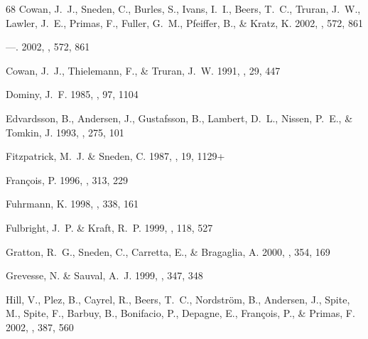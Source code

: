 \documentclass[12pt,preprint]{aastex}
\begin{document}
{\begin{thebibliography}{68}
{Cowan}, J.~J., {Sneden}, C., {Burles}, S., {Ivans}, I.~I., {Beers}, T.~C.,
  {Truran}, J.~W., {Lawler}, J.~E., {Primas}, F., {Fuller}, G.~M., {Pfeiffer},
  B., \& {Kratz}, K. 2002{}, \apj, 572, 861

---. 2002{}, \apj, 572, 861

{Cowan}, J.~J., {Thielemann}, F., \& {Truran}, J.~W. 1991, \araa, 29, 447

{Dominy}, J.~F. 1985, \pasp, 97, 1104

{Edvardsson}, B., {Andersen}, J., {Gustafsson}, B., {Lambert}, D.~L., {Nissen},
  P.~E., \& {Tomkin}, J. 1993, \aap, 275, 101

{Fitzpatrick}, M.~J. \& {Sneden}, C. 1987, \baas, 19, 1129+

{Fran\c{c}ois}, P. 1996, \aap, 313, 229

{Fuhrmann}, K. 1998, \aap, 338, 161

{Fulbright}, J.~P. \& {Kraft}, R.~P. 1999, \aj, 118, 527

{Gratton}, R.~G., {Sneden}, C., {Carretta}, E., \& {Bragaglia}, A. 2000, \aap,
  354, 169

{Grevesse}, N. \& {Sauval}, A.~J. 1999, \aap, 347, 348

{Hill}, V., {Plez}, B., {Cayrel}, R., {Beers}, T.~C., {Nordstr{\" o}m}, B.,
  {Andersen}, J., {Spite}, M., {Spite}, F., {Barbuy}, B., {Bonifacio}, P.,
  {Depagne}, E., {Fran{\c c}ois}, P., \& {Primas}, F. 2002, \aap, 387, 560


\end{thebibliography}}
\end{document}
